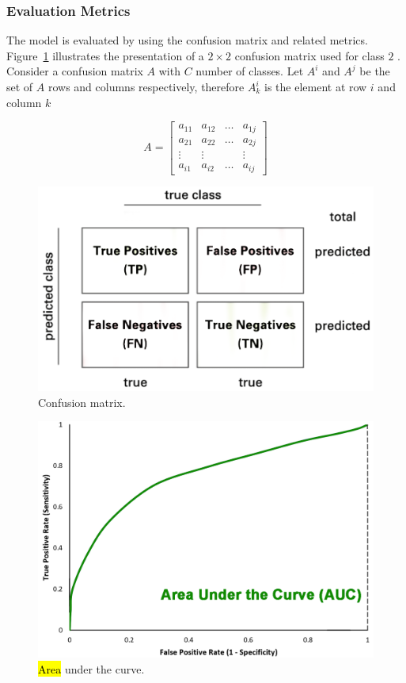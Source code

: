 \documentclass[sensors,article,accept,pdftex,moreauthors]{Definitions/mdpi}
\begin{document}
	\subsubsection{Evaluation Metrics}

	The model is evaluated by using the confusion matrix and related metrics. Figure~\ref{fig:confusion-matrix} illustrates the presentation of a $2 \times 2$ confusion matrix used for class $2$ . Consider a confusion matrix $A$ with $C$ number of classes. Let $A^i$ and $A^j$ be the set of $A$ rows and columns respectively, therefore $A^i_k$ is the element at row $i$ and column $k$
	
	\[
	A = \begin{bmatrix}
		a_{11} & a_{12} & \dots & a_{1j} \\
		a_{21} & a_{22} & \dots & a_{2j} \\
		\vdots & \vdots	&  & \vdots\\
		a_{i1} & a_{i2} & \dots & a_{ij} 
	\end{bmatrix}
	\]

\vspace{-12pt}
		\begin{figure}[H]
\includegraphics[width=0.7\linewidth]{Definitions/Confusion-matrix}
\caption{Confusion matrix.}\label{fig:confusion-matrix}
		\end{figure}\unskip
\begin{figure}[H]
\includegraphics[width=.7\linewidth]{Definitions/AUC}
\caption{\hl{Area} %
 under the curve.}\label{fig:AUC}
	\end{figure}
	
\end{document}
